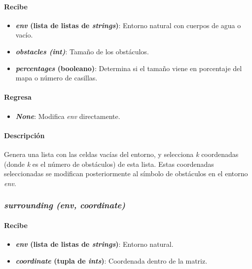 \documentclass[12pt, letterpaper]{article}
\begin{document}
            \paragraph{Recibe}
                \begin{itemize}
                    \item \textbf{\textit{env} (lista de listas de \textit{strings})}: Entorno natural con cuerpos de agua o vacío.
                    \item \textbf{\textit{obstacles (int)}}: Tamaño de los obstáculos.
                    \item \textbf{\textit{percentages} (booleano)}: Determina si el tamaño viene en porcentaje del mapa o número de casillas.
                \end{itemize}
            \paragraph{Regresa}
                \begin{itemize}
                    \item \textbf{\textit{None}}: Modifica \textit{env} directamente.
                \end{itemize}
            \paragraph{Descripción}
                Genera una lista con las celdas vacías del entorno, y selecciona \textit{k} coordenadas (donde \textit{k} es el número de obstáculos) de esta lista. Estas coordenadas seleccionadas se modifican posteriormente al símbolo de obstáculos en el entorno \textit{env}.
        \subsubsection{\textit{surrounding (env, coordinate)}}
            \paragraph{Recibe}
                \begin{itemize}
                    \item \textbf{\textit{env} (lista de listas de \textit{strings})}: Entorno natural.
                    \item \textbf{\textit{coordinate} (tupla de \textit{ints})}: Coordenada dentro de la matriz.
                \end{itemize}
\end{document}
